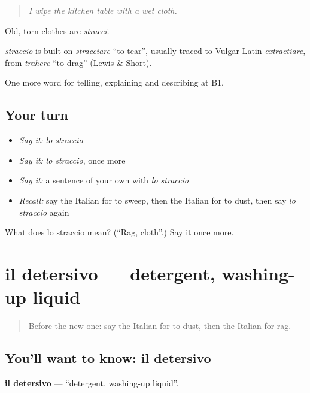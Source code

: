 \begin{quote}
\emph{I wipe the kitchen table with a wet cloth.}
\end{quote}

Old, torn clothes are \emph{stracci}.

\begin{cousinweb}
\emph{straccio} is built on \emph{stracciare} \textquotedblleft{}to tear\textquotedblright{}, usually traced to Vulgar Latin \emph{extractiāre}, from \emph{trahere} \textquotedblleft{}to drag\textquotedblright{} (Lewis \& Short).
\end{cousinweb}

\begin{grammarlens}[title={What you've built}]
One more word for telling, explaining and describing at B1.
\end{grammarlens}

\subsection*{Your turn}
\begin{itemize}
\raggedright
  \item \emph{Say it:} \emph{lo straccio}
  \item \emph{Say it:} \emph{lo straccio}, once more
  \item \emph{Say it:} a sentence of your own with \emph{lo straccio}
  \item \emph{Recall:} say the Italian for to sweep, then the Italian for to dust, then say \emph{lo straccio} again
\end{itemize}

\begin{tcolorbox}[breakable,colback=teal!4,colframe=teal!35!black,title={Before you move on}]
What does lo straccio mean? (\textquotedblleft{}Rag, cloth\textquotedblright{}.) Say it once more.
\end{tcolorbox}
\section[il detersivo]{il detersivo — detergent, washing-up liquid}

\label{lesson:IT-C532-detersivo}



\begin{quote}
Before the new one: say the Italian for to dust, then the Italian for rag.
\end{quote}

\subsection*{You'll want to know: il detersivo}
\textbf{il detersivo} — \textquotedblleft{}detergent, washing-up liquid\textquotedblright{}.

